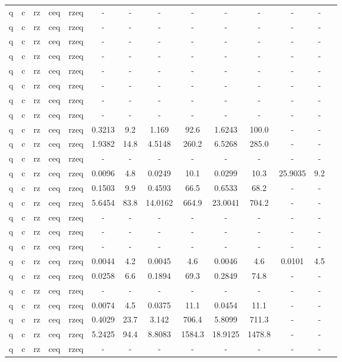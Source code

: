 \begin{table}[htb]
{\begin{tabular}{|c|c|c|c|c|c|c|c|c|c|c|c|c|c|}
q & c & rz & ceq & rzeq & - & - & - & - & - & - & - & - \\ 
q & c & rz & ceq & rzeq & - & - & - & - & - & - & - & - \\ 
q & c & rz & ceq & rzeq & - & - & - & - & - & - & - & - \\ 
q & c & rz & ceq & rzeq & - & - & - & - & - & - & - & - \\ 
q & c & rz & ceq & rzeq & - & - & - & - & - & - & - & - \\ 
q & c & rz & ceq & rzeq & - & - & - & - & - & - & - & - \\ 
q & c & rz & ceq & rzeq & - & - & - & - & - & - & - & - \\ 
q & c & rz & ceq & rzeq & - & - & - & - & - & - & - & - \\ 
q & c & rz & ceq & rzeq & 0.3213 & 9.2 & 1.169 & 92.6 & 1.6243 & 100.0 & - & - \\ 
q & c & rz & ceq & rzeq & 1.9382 & 14.8 & 4.5148 & 260.2 & 6.5268 & 285.0 & - & - \\ 
q & c & rz & ceq & rzeq & - & - & - & - & - & - & - & - \\ 
q & c & rz & ceq & rzeq & 0.0096 & 4.8 & 0.0249 & 10.1 & 0.0299 & 10.3 & 25.9035 & 9.2 \\ 
q & c & rz & ceq & rzeq & 0.1503 & 9.9 & 0.4593 & 66.5 & 0.6533 & 68.2 & - & - \\ 
q & c & rz & ceq & rzeq & 5.6454 & 83.8 & 14.0162 & 664.9 & 23.0041 & 704.2 & - & - \\ 
q & c & rz & ceq & rzeq & - & - & - & - & - & - & - & - \\ 
q & c & rz & ceq & rzeq & - & - & - & - & - & - & - & - \\ 
q & c & rz & ceq & rzeq & - & - & - & - & - & - & - & - \\ 
q & c & rz & ceq & rzeq & 0.0044 & 4.2 & 0.0045 & 4.6 & 0.0046 & 4.6 & 0.0101 & 4.5 \\ 
q & c & rz & ceq & rzeq & 0.0258 & 6.6 & 0.1894 & 69.3 & 0.2849 & 74.8 & - & - \\ 
q & c & rz & ceq & rzeq & - & - & - & - & - & - & - & - \\ 
q & c & rz & ceq & rzeq & 0.0074 & 4.5 & 0.0375 & 11.1 & 0.0454 & 11.1 & - & - \\ 
q & c & rz & ceq & rzeq & 0.4029 & 23.7 & 3.142 & 706.4 & 5.8099 & 711.3 & - & - \\ 
q & c & rz & ceq & rzeq & 5.2425 & 94.4 & 8.8083 & 1584.3 & 18.9125 & 1478.8 & - & - \\ 
q & c & rz & ceq & rzeq & - & - & - & - & - & - & - & - \\ 

\end{tabular}}
\end{table}
